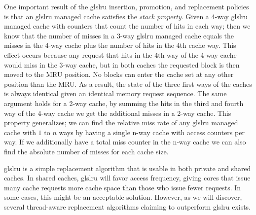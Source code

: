 One important result of the gls{lru} insertion, promotion, and replacement policies is that an gls{lru} managed cache satisfies the \textit{stack property}.
Given a 4-way gls{lru} managed cache with counters that count the number of hits in each way; then we know that the number of misses in a 3-way gls{lru} managed cache equals the misses in the 4-way cache plus the number of hits in the 4th cache way.
This effect occurs because any request that hits in the 4th way of the 4-way cache would miss in the 3-way cache, but in both caches the requested block is then moved to the MRU position.
No blocks can enter the cache set at any other position than the MRU.
As a result, the state of the three first ways of the caches is always identical given an identical memory request sequence.
The same argument holds for a 2-way cache, by summing the hits in the third and fourth way of the 4-way cache we get the additional misses in a 2-way cache.
This property generalizes; we can find the relative miss rate of any gls{lru} managed cache with $1$ to $n$ ways by having a single n-way cache with access counters per way.
If we additionally have a total miss counter in the n-way cache we can also find the absolute number of misses for each cache size.

gls{lru} is a simple replacement algorithm that is usable in both private and shared caches.
In shared caches, gls{lru} will favor access frequency, giving cores that issue many cache requests more cache space than those who issue fewer requests. 
In some cases, this might be an acceptable solution. 
However, as we will discover, several thread-aware replacement algorithms claiming to outperform gls{lru} exists. 
